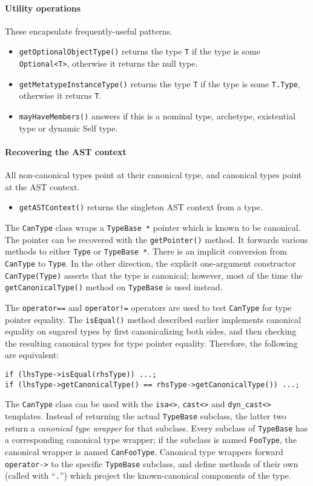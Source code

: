 \documentclass[../generics]{subfiles}
\begin{document}
\paragraph{Utility operations} These encapsulate frequently-useful patterns.
\begin{itemize}
\item \texttt{getOptionalObjectType()} returns the type \texttt{T} if the type is some \texttt{Optional<T>}, otherwise it returns the null type.
\item \texttt{getMetatypeInstanceType()} returns the type \texttt{T} if the type is some \texttt{T.Type}, otherwise it returns \texttt{T}.
\item \texttt{mayHaveMembers()} answers if this is a nominal type, archetype, existential type or dynamic Self type.
\end{itemize}

\paragraph{Recovering the AST context} All non-canonical types point at their canonical type, and canonical types point at the AST context.
\begin{itemize}
\item \texttt{getASTContext()} returns the singleton AST context from a type.
\end{itemize}

The \texttt{CanType} class wraps a \texttt{TypeBase *} pointer which is known to be canonical. The pointer can be recovered with the \texttt{getPointer()} method. It forwards various methods to either \texttt{Type} or \texttt{TypeBase~*}. There is an implicit conversion from \texttt{CanType} to \texttt{Type}. In the other direction, the explicit one-argument constructor \texttt{CanType(Type)} asserts that the type is canonical; however, most of the time the \texttt{getCanonicalType()} method on \texttt{TypeBase} is used instead.

The \texttt{operator==} and \texttt{operator!=} operators are used to test \texttt{CanType} for type pointer equality. The \texttt{isEqual()} method described earlier implements canonical equality on sugared types by first canonicalizing both sides, and then checking the resulting canonical types for type pointer equality. Therefore, the following are equivalent:
\begin{Verbatim}
if (lhsType->isEqual(rhsType)) ...;
if (lhsType->getCanonicalType() == rhsType->getCanonicalType()) ...;
\end{Verbatim}
The \texttt{CanType} class can be used with the \verb|isa<>|, \verb|cast<>| and \verb|dyn_cast<>| templates. Instead of returning the actual \texttt{TypeBase} subclass, the latter two return a \emph{canonical type wrapper} for that subclass. Every subclass of \texttt{TypeBase} has a corresponding canonical type wrapper; if the subclass is named \texttt{FooType}, the canonical wrapper is named \texttt{CanFooType}. Canonical type wrappers forward \texttt{operator->} to the specific \texttt{TypeBase} subclass, and define methods of their own (called with ``\texttt{.}'') which project the known-canonical components of the type.
\end{document}

